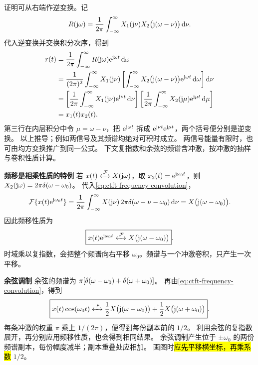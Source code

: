 证明可从右端作逆变换。记
\[
  R(\mathrm{j}\omega)=\frac{1}{2\pi}
    \int_{-\infty}^{\infty}
    X_1(\mathrm{j}\nu)X_2\bigl(\mathrm{j}(\omega-\nu)\bigr)\mathop{}\!\mathrm{d}\nu.
\]
代入逆变换并交换积分次序，得到
\begin{align*}
  r(t)
  &=\frac{1}{2\pi}\int_{-\infty}^{\infty}
    R(\mathrm{j}\omega)\mathrm{e}^{\mathrm{j}\omega t}\mathop{}\!\mathrm{d}\omega\\
  &=\frac{1}{(2\pi)^2}\int_{-\infty}^{\infty}X_1(\mathrm{j}\nu)
    \left[\int_{-\infty}^{\infty}
      X_2\bigl(\mathrm{j}(\omega-\nu)\bigr)\mathrm{e}^{\mathrm{j}\omega t}\mathop{}\!\mathrm{d}\omega\right]\mathop{}\!\mathrm{d}\nu\\
  &=\left[\frac{1}{2\pi}\int_{-\infty}^{\infty}
      X_1(\mathrm{j}\nu)\mathrm{e}^{\mathrm{j}\nu t}\mathop{}\!\mathrm{d}\nu\right]
    \left[\frac{1}{2\pi}\int_{-\infty}^{\infty}
      X_2(\mathrm{j}\mu)\mathrm{e}^{\mathrm{j}\mu t}\mathop{}\!\mathrm{d}\mu\right]\\
  &=x_1(t)x_2(t).
\end{align*}
第三行在内层积分中令 $\mu=\omega-\nu$，把
$\mathrm{e}^{\mathrm{j}\omega t}$ 拆成 $\mathrm{e}^{\mathrm{j}\nu t}\mathrm{e}^{\mathrm{j}\mu t}$，两个括号便分别是逆变换。
以上推导；例如两信号及其频谱均绝对可积时成立。
两信号能量有限时，也可由均方变换推广到同一公式。
下文复指数和余弦的频谱含冲激，按冲激的抽样与卷积性质计算。

\noindent\textbf{频移是相乘性质的特例}\quad
若 $x(t)\mathrel{\xleftrightarrow{\,\mathcal{F}\,}} X(\mathrm{j}\omega)$，取
$x_2(t)=\mathrm{e}^{\mathrm{j}\omega_0t}$，则
$X_2(\mathrm{j}\omega)=2\pi\delta(\omega-\omega_0)$。
代入\cref{eq:ctft-frequency-convolution}，
\[
  \mathcal{F}\{x(t)\mathrm{e}^{\mathrm{j}\omega_0t}\}
  =\frac{1}{2\pi}\int_{-\infty}^{\infty}
    X(\mathrm{j}\nu)\,2\pi\delta(\omega-\nu-\omega_0)\mathop{}\!\mathrm{d}\nu
  =X\bigl(\mathrm{j}(\omega-\omega_0)\bigr).
\]
因此频移性质为
\begin{equation}
  \boxed{x(t)\mathrm{e}^{\mathrm{j}\omega_0t}
  \mathrel{\xleftrightarrow{\,\mathcal{F}\,}}
  X\bigl(\mathrm{j}(\omega-\omega_0)\bigr)}.
  \label{eq:ctft-frequency-shift}
\end{equation}
时域乘以复指数，会把整个频谱向右平移 $\omega_0$。频谱与一个冲激卷积，只产生一次平移。

\noindent\textbf{余弦调制}\quad
余弦的频谱为
$\pi[\delta(\omega-\omega_0)+\delta(\omega+\omega_0)]$。
再由\cref{eq:ctft-frequency-convolution}，得到
\begin{equation}
  \boxed{x(t)\cos(\omega_0t)
  \mathrel{\xleftrightarrow{\,\mathcal{F}\,}}
  \frac12X\bigl(\mathrm{j}(\omega-\omega_0)\bigr)
  +\frac12X\bigl(\mathrm{j}(\omega+\omega_0)\bigr)}.
  \label{eq:ctft-cosine-modulation}
\end{equation}
每条冲激的权重 $\pi$ 乘上 $1/(2\pi)$，便得到每份副本前的 $1/2$。
利用余弦的复指数展开，再分别应用频移性质，也会得到相同结果。
余弦调制产生位于 $\pm\omega_0$ 的两份频谱副本，每份幅度减半；副本重叠处应相加。
画图时\hl{应先平移横坐标，再乘系数} $1/2$。

